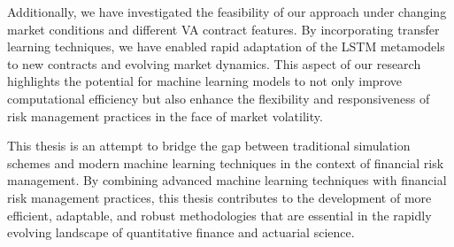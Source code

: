 Additionally, we have investigated the feasibility of our approach under changing market conditions and different VA contract features. 
By incorporating transfer learning techniques, we have enabled rapid adaptation of the LSTM metamodels to new contracts and evolving market dynamics. 
This aspect of our research highlights the potential for machine learning models to not only improve computational efficiency but also enhance the flexibility and responsiveness of risk management practices in the face of market volatility.

This thesis is an attempt to bridge the gap between traditional simulation schemes and modern machine learning techniques in the context of financial risk management.
By combining advanced machine learning techniques with financial risk management practices, this thesis contributes to the development of more efficient, adaptable, and robust methodologies that are essential in the rapidly evolving landscape of quantitative finance and actuarial science.